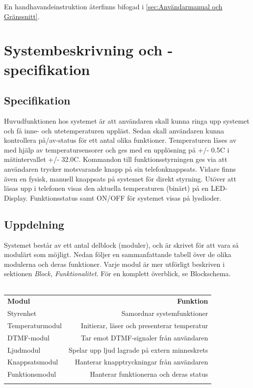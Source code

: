 \documentclass[a4paper,11pt]{article}
\begin{document}
	En handhavandeinstruktion återfinns bifogad i \ref{sec:Användarmanual och Gränssnitt}.

\pagebreak

\section{Systembeskrivning och -specifikation}

	\subsection{Specifikation}

	Huvudfunktionen hos systemet är att användaren skall kunna ringa upp systemet och få inne- och utetemperaturen
	uppläst. Sedan skall användaren kunna kontrollera på/av-status för ett antal olika funktioner. Temperaturen
	läses av med hjälp av temperatursensorer och ges med en upplösning på +/- 0.5C i mätintervallet +/- 32.0C.
	Kommandon till funktionsstyrningen ges via att användaren trycker motsvarande knapp på sin telefonknappsats.
	Vidare finns även en fysisk, manuell knappsats på systemet för direkt styrning. Utöver att läsas upp i 
	telefonen visas den aktuella temperaturen (binärt) på en LED-Display. Funktionsstatus samt ON/OFF för systemet
	visas på lysdioder.

	\subsection{Uppdelning}

	Systemet består av ett antal delblock (moduler), och är skrivet för att vara så modulärt som möjligt.
	Nedan följer en sammanfattande tabell över de olika modulerna och deras funktioner. Varje modul är mer
	utförligt beskriven i sektionen {\it Block, Funktionalitet}. För en komplett överblick, se Blockschema. \\\\

	\begin{tabular}{l r}
		{\bf Modul} & {\bf Funktion}\\
	   	Styrenhet & Samordnar systemfunktioner\\
	  	Temperaturmodul & Initierar, läser och presenterar temperatur\\
	   	DTMF-modul & Tar emot DTMF-signaler från användaren\\
		Ljudmodul & Spelar upp ljud lagrade på extern minneskrets\\
		Knappsatsmodul & Hanterar knapptryckningar från användaren\\
		Funktionsmodul & Hanterar funktionerna och deras status\\\\
	\end{tabular}
\end{document}
